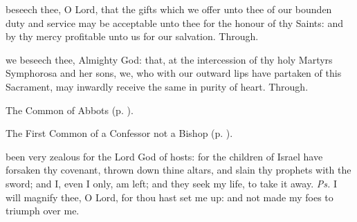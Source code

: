 
\vspace{-0.5\baselineskip}

\secret

\vspace{-0.25\baselineskip}

 beseech thee, O Lord, that the gifts which we offer unto thee of our bounden duty and service may be acceptable unto thee for the honour of thy Saints: and by thy mercy profitable unto us for our salvation. Through.


\vspace{-0.5\baselineskip}

\postcommunion

\vspace{-0.25\baselineskip}

 we beseech thee, Almighty God: that, at the intercession of thy holy Martyrs Symphorosa and her sons, we, who with our outward lips have partaken of this Sacrament, may inwardly receive the same in purity of heart. Through.



\begin{rubric}
	The Common of Abbots (p. \pageref{CommonAbbots}).
\end{rubric}


\begin{rubric}
	The First Common of a Confessor not a Bishop (p. \pageref{CommonConfessorNotBishopI}).
\end{rubric}



\introit
{} been very zealous for the Lord God of hosts: for the children of Israel have forsaken thy covenant, thrown down thine altars, and slain thy prophets with the sword; and I, even I only, am left; and they seek my life, to take it away. \textit{Ps.} I will magnify thee, O Lord, for thou hast set me up: and not made my foes to triumph over me.


